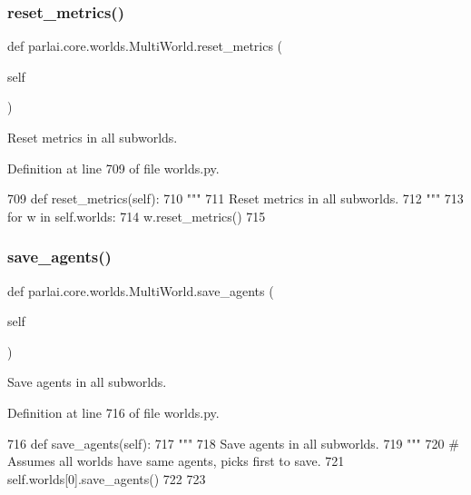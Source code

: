 \subsubsection{\texorpdfstring{reset\+\_\+metrics()}{reset\_metrics()}}
{\footnotesize\ttfamily def parlai.\+core.\+worlds.\+Multi\+World.\+reset\+\_\+metrics (\begin{DoxyParamCaption}\item[{}]{self }\end{DoxyParamCaption})}

\begin{DoxyVerb}Reset metrics in all subworlds.
\end{DoxyVerb}
 

Definition at line 709 of file worlds.\+py.


\begin{DoxyCode}
709     \textcolor{keyword}{def }reset\_metrics(self):
710         \textcolor{stringliteral}{"""}
711 \textcolor{stringliteral}{        Reset metrics in all subworlds.}
712 \textcolor{stringliteral}{        """}
713         \textcolor{keywordflow}{for} w \textcolor{keywordflow}{in} self.worlds:
714             w.reset\_metrics()
715 
\end{DoxyCode}
\mbox{\label{classparlai_1_1core_1_1worlds_1_1MultiWorld_a4d72a950f8aae3d248a9694908f0fc85}} 
\subsubsection{\texorpdfstring{save\+\_\+agents()}{save\_agents()}}
{\footnotesize\ttfamily def parlai.\+core.\+worlds.\+Multi\+World.\+save\+\_\+agents (\begin{DoxyParamCaption}\item[{}]{self }\end{DoxyParamCaption})}

\begin{DoxyVerb}Save agents in all subworlds.
\end{DoxyVerb}
 

Definition at line 716 of file worlds.\+py.


\begin{DoxyCode}
716     \textcolor{keyword}{def }save\_agents(self):
717         \textcolor{stringliteral}{"""}
718 \textcolor{stringliteral}{        Save agents in all subworlds.}
719 \textcolor{stringliteral}{        """}
720         \textcolor{comment}{# Assumes all worlds have same agents, picks first to save.}
721         self.worlds[0].save\_agents()
722 
723 
\end{DoxyCode}
\mbox{\label{classparlai_1_1core_1_1worlds_1_1MultiWorld_ae780a8cfd7c6b675727cca24b8321015}} 
